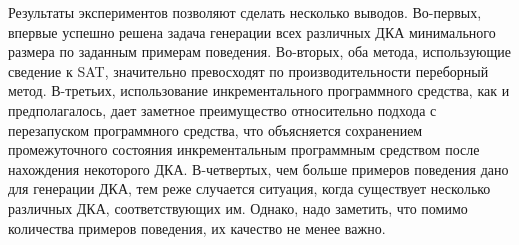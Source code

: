 Результаты экспериментов позволяют сделать несколько выводов.
Во-первых, впервые успешно решена задача генерации всех различных ДКА минимального размера по заданным примерам поведения.
Во-вторых, оба метода, использующие сведение к SAT, значительно превосходят по производительности переборный метод.
В-третьих, использование инкрементального программного средства, как и предполагалось, дает заметное преимущество относительно подхода с перезапуском программного средства, что объясняется сохранением промежуточного состояния инкрементальным программным средством после нахождения некоторого ДКА.
В-четвертых, чем больше примеров поведения дано для генерации ДКА, тем реже случается ситуация, когда существует несколько различных ДКА, соответствующих им.
Однако, надо заметить, что помимо количества примеров поведения, их качество не менее важно.



\chresults{\ref{sec:findall}}
